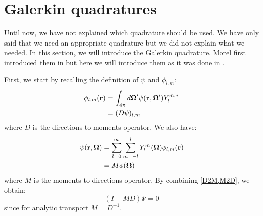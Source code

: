 \section{Galerkin quadratures}
Until now, we have not explained which quadrature should be used. We have only
said that we need an appropriate quadrature but we did not explain what we
needed. In this section, we will introduce the Galerkin quadrature. Morel
first introduced them in \cite{galerkin_morel} but here we
will introduce them as it was done in \cite{pautz_fp}. 

First, we start by recalling the definition of $\psi$ and $\phi_{l,m}$:
\begin{equation}
\begin{split}
\phi_{l,m}(\br) &= \int_{4\pi} d\bo' \psi(\br,\bo') Y_l^{m,*}\\
&=(D \psi)_{l,m}
\end{split}
\label{D2M}
\end{equation}
where $D$ is the directions-to-moments operator. We also have:
\begin{equation}
\begin{split}
\psi(\br,\bo) &= \sum_{l=0}^{\infty} \sum_{m=-l}^l Y_l^m(\bo)\phi_{l,m}(\br)\\
&= M\phi(\bo)
\end{split}
\label{M2D}
\end{equation}
where $M$ is the moments-to-directions operator. By combining \cref{D2M,M2D}, 
we obtain:
\begin{equation}
(I-MD)\Psi = 0
\label{identity_alpha}
\end{equation}
since for analytic transport $M=D^{-1}$.

